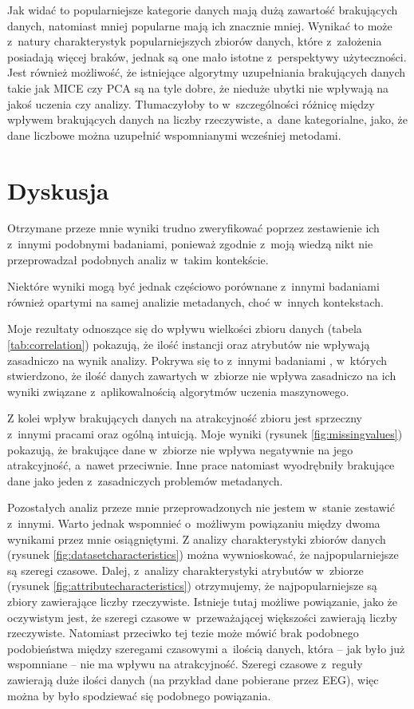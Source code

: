 Jak widać to popularniejsze kategorie danych mają dużą zawartość brakujących danych, natomiast mniej popularne mają ich znacznie mniej.
Wynikać to może z~natury charakterystyk popularniejszych zbiorów danych, które z~założenia posiadają więcej braków, jednak są one mało istotne z~perspektywy użyteczności.
Jest również możliwość, że istniejące algorytmy uzupełniania brakujących danych takie jak MICE czy PCA są na tyle dobre, że nieduże ubytki nie wpływają na jakoś uczenia czy analizy.
Tłumaczyłoby to w~szczególności różnicę między wpływem brakujących danych na liczby rzeczywiste, a~dane kategorialne, jako, że dane liczbowe można uzupełnić wspomnianymi wcześniej metodami.

\section{Dyskusja}

Otrzymane przeze mnie wyniki trudno zweryfikować poprzez zestawienie ich z~innymi podobnymi badaniami, ponieważ zgodnie z~moją wiedzą nikt nie przeprowadzał podobnych analiz w~takim kontekście.

Niektóre wyniki mogą być jednak częściowo porównane z~innymi badaniami również opartymi na samej analizie metadanych, choć w~innych kontekstach.

Moje rezultaty odnoszące się do wpływu wielkości zbioru danych (tabela \ref{tab:correlation}) pokazują, że ilość instancji oraz atrybutów nie wpływają zasadniczo na wynik analizy.
Pokrywa się to z~innymi badaniami \cite{brazdil1994characterizing}, w~których stwierdzono, że ilość danych zawartych w~zbiorze nie wpływa zasadniczo na ich wyniki związane z~aplikowalnością algorytmów uczenia maszynowego.

Z kolei wpływ brakujących danych na atrakcyjność zbioru jest sprzeczny z~innymi pracami oraz ogólną intuicją.
Moje wyniki (rysunek \ref{fig:missingvalues}) pokazują, że brakujące dane w~zbiorze nie wpływa negatywnie na jego atrakcyjność, a~nawet przeciwnie.
Inne prace \cite{yasser2011analysis} natomiast wyodrębniły brakujące dane jako jeden z~zasadniczych problemów metadanych.

Pozostałych analiz przeze mnie przeprowadzonych nie jestem w~stanie zestawić z~innymi.
Warto jednak wspomnieć o~możliwym powiązaniu między dwoma wynikami przez mnie osiągniętymi.
Z analizy charakterystyki zbiorów danych (rysunek \ref{fig:datasetcharacteristics}) można wywnioskować, że najpopularniejsze są szeregi czasowe.
Dalej, z~analizy charakterystyki atrybutów w~zbiorze (rysunek \ref{fig:attributecharacteristics}) otrzymujemy, że najpopularniejsze są zbiory zawierające liczby rzeczywiste.
Istnieje tutaj możliwe powiązanie, jako że oczywistym jest, że szeregi czasowe w~przeważającej większości zawierają liczby rzeczywiste.
Natomiast przeciwko tej tezie może mówić brak podobnego podobieństwa między szeregami czasowymi a~ilością danych, która -- jak było już wspomniane -- nie ma wpływu na atrakcyjność.
Szeregi czasowe z~reguły zawierają duże ilości danych (na przykład dane pobierane przez EEG), więc można by było spodziewać się podobnego powiązania.

